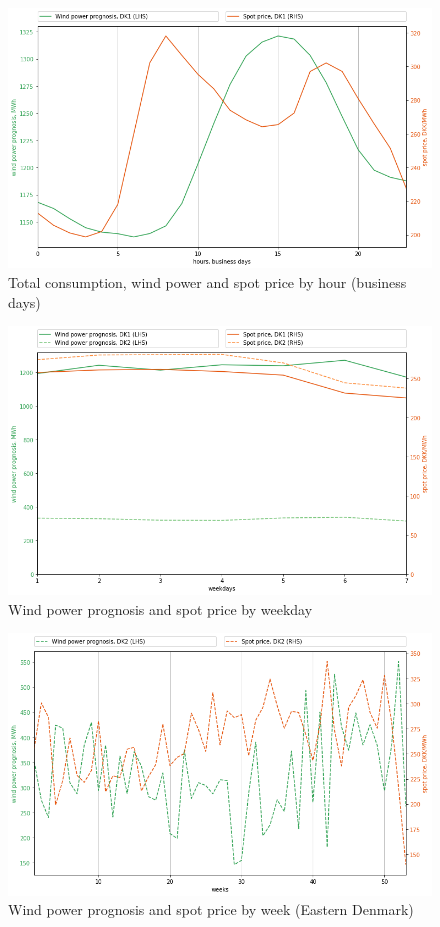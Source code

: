 \begin{figure}[H]
  \centering
  \caption{Total consumption, wind power and spot price by hour (business days)}
  \label{fig:wp_dk1_hours}
    \includegraphics[width=1 \textwidth]{03_figures/wp_DK1_hours, business days}
\end{figure}

\begin{figure}[H]
  \centering
  \caption{Wind power prognosis and spot price by weekday}
  \label{fig:wp_price_weekday}
    \includegraphics[width=1 \textwidth]{03_figures/wp_weekdays}
\end{figure}

\begin{figure}[H]
  \centering
  \caption{Wind power prognosis and spot price by week (Eastern Denmark)}
  \label{fig:wp_price_dk2_week}
    \includegraphics[width=1 \textwidth]{03_figures/wp_DK2_weeks}
\end{figure}
